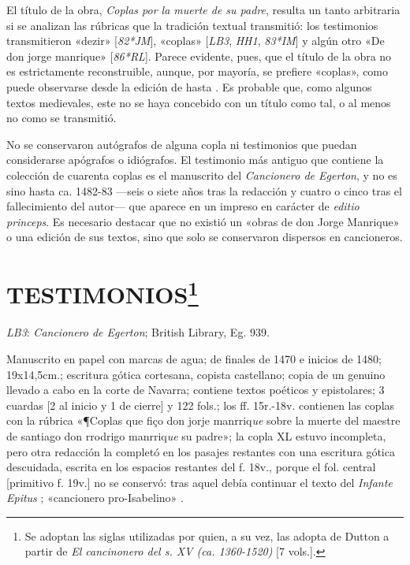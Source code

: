 \documentclass[11pt,a4paper,twoside]{article}
\newcommand{\comillas}[1]{«#1»}
\begin{document}
El título de la obra, \textit{Coplas por la muerte de su padre}, resulta un tanto arbitraria si se analizan las rúbricas que la tradición textual transmitió: los testimonios transmitieron \comillas{dezir} [\textit{82*JM}], \comillas{coplas} [\textit{LB3}, \textit{HH1}, \textit{83*IM}] y algún otro \comillas{De don jorge manrique} [\textit{86*RL}]. Parece evidente, pues, que el título de la obra no es estrictamente reconstruible, aunque, por mayoría, se prefiere \comillas{coplas}, como puede observarse desde la edición de \textcite{Foulché-Delbosc1902} hasta \textcite{Beltrán2013}. Es probable que, como algunos textos medievales, este no se haya concebido con un título como tal, o al menos no como se transmitió.

No se conservaron autógrafos de alguna copla ni testimonios que puedan considerarse apógrafos o idiógrafos. El testimonio más antiguo que contiene la colección de cuarenta coplas es el manuscrito del \textit{Cancionero de Egerton}, y no es sino hasta ca. 1482-83 —seis o siete años tras la redacción y cuatro o cinco tras el fallecimiento del autor— que aparece en un impreso en carácter de \textit{editio princeps}. Es necesario destacar que no existió un \comillas{obras de don Jorge Manrique} o una edición de sus textos, sino que solo se conservaron dispersos en cancioneros.

\section*{\fontsize{13}{14.35}\selectfont TESTIMONIOS\footnote{ Se adoptan las siglas utilizadas por \textcite{PérezPriego2017} quien, a su vez, las adopta de Dutton a partir de \textit{El cancinonero del s. XV (ca. 1360-1520)} [7 vols.].}}

\textit{LB3}: \textit{Cancionero de Egerton}; British Library, Eg. 939.

Manuscrito en papel con marcas de agua; de finales de 1470 e inicios de 1480; 19x14,5cm.; escritura gótica cortesana, copista castellano; copia de un genuino llevado a cabo en la corte de Navarra; contiene textos poéticos y epistolares; 3 cuardas [2 al inicio y 1 de cierre] y 122 fols.; los ff. 15r.-18v. contienen las coplas con la rúbrica \comillas{¶Coplas que fiço don jorje manrriq\textit{ue} sobre la muerte del maestre de santiago don rrodrigo manrriq\textit{ue} su padre}; la copla XL estuvo incompleta, pero otra redacción la completó en los pasajes restantes con una escritura gótica descuidada, escrita en los espacios restantes del f. 18v., porque el fol. central [primitivo f. 19v.] no se conservó: tras aquel debía continuar el texto del \textit{Infante Epitus} \textcite{Beltrán2011}; \comillas{cancionero pro-Isabelino} \parencite{Severin2000}.\vspace{5pt}
\end{document}
